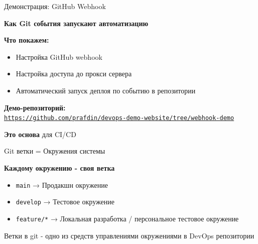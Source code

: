 \documentclass[aspectratio=169]{beamer}
\begin{document}
    \begin{frame}{Демонстрация: GitHub Webhook}
        \begin{center}
            \large
            \textbf{Как Git события запускают автоматизацию}
        \end{center}
        
        \vspace{0.5cm}
        
        \textbf{Что покажем:}
        \begin{itemize}
            \item Настройка GitHub webhook
            \item Настройка доступа до прокси сервера
            \item Автоматический запуск деплоя по событию в репозитории
        \end{itemize}
        
        \vspace{0.2cm}
        \textbf{Демо-репозиторий:} \\
        \href{https://github.com/prafdin/devops-demo-website/tree/webhook-demo}{\texttt{https://github.com/prafdin/devops-demo-website/tree/webhook-demo}}
        
        \vspace{0.2cm}
        
        \textbf{Это основа} для CI/CD
    \end{frame}

    \begin{frame}{Git ветки = Окружения системы}
        \begin{center}
            \large
            \textbf{Каждому окружению - своя ветка}
        \end{center}
        
        \vspace{0.5cm}
        
        \begin{itemize}
            \item \texttt{main} → Продакшн окружение
            \item \texttt{develop} → Тестовое окружение
            \item \texttt{feature/*} → Локальная разработка / персональное тестовое окружение
        \end{itemize}
        
        \vspace{0.2cm}

        Ветки в git - одно из средств управлениями окружениями в DevOps репозитории
    \end{frame}
\end{document}
